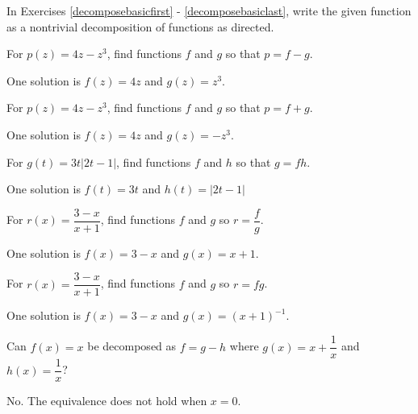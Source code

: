 \documentclass{ximera}
\begin{document}
\begin{question}
In Exercises \ref{decomposebasicfirst} - \ref{decomposebasiclast}, write the given function as a nontrivial decomposition of functions as directed.

\begin{problem}\label{decomposebasicfirst}
For $p(z) = 4z-z^3$, find functions $f$ and $g$ so that $p=f-g$.
\begin{solution}
One solution is $f(z) = 4z$ and $g(z) = z^3$.
\end{solution}
\end{problem}
  
\begin{problem}
For $p(z) = 4z-z^3$, find functions $f$ and $g$ so that $p=f+g$.
\begin{solution}
    One solution is $f(z) = 4z$ and $g(z) = - z^3$.
\end{solution}
\end{problem} 

\begin{problem}
For $g(t) = 3t|2t-1|$, find functions $f$ and $h$  so that $g = fh$.
\begin{solution}
    One solution is  $f(t) = 3t$ and $h(t) = |2t-1|$ 
\end{solution}
\end{problem}

\begin{problem}
For $r(x) = \dfrac{3-x}{x+1}$, find functions $f$ and $g$ so $r = \dfrac{f}{g}$.
\begin{solution}
    One solution is $f(x) = 3-x$ and $g(x) = x+1$. 
\end{solution}
\end{problem} 

\begin{problem}\label{decomposebasiclast}
For $r(x) = \dfrac{3-x}{x+1}$, find functions $f$ and $g$ so $r = fg$.
\begin{solution}
    One solution is $f(x) = 3-x$ and $g(x) = (x+1)^{-1}$. 
\end{solution}
\end{problem} 



\end{question}

\begin{problem}
Can $f(x) = x$ be decomposed as $f = g-h$ where $g(x) = x+\dfrac{1}{x}$ and $h(x) = \dfrac{1}{x}$? 
\begin{solution}
    No.  The equivalence does not hold when $x = 0$.
\end{solution}
\end{problem}
\end{document}

